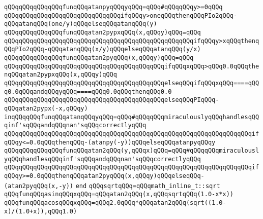 \newline
\verb|qQQqqQQqqQQqqQQqfunqQQqatanpyqQQqyqQQq=qQQq#qQQqqQQqy>=0qQQq|\newline
\verb|qQQqqQQqqQQqqQQqqQQqqQQqqQQqqQQqifqQQqy>oneqQQqthenqQQqPIo2qQQq-qQQqatanqQQq(one/y)qQQqelseqQQqatanqQQq(y)|\newline
\newline
\verb|qQQqqQQqqQQqqQQqfunqQQqatan2pypxqQQq(x,qQQqy)qQQq=qQQq|\newline
\verb|qQQqqQQqqQQqqQQqqQQqqQQqqQQqqQQqqQQqqQQqqQQqqQQqqQQqifqQQqy>xqQQqthenqQQqPIo2qQQq-qQQqatanqQQq(x/y)qQQqelseqQQqatanqQQq(y/x)|\newline
\newline
\verb|qQQqqQQqqQQqqQQqfunqQQqatan2pyqQQq(x,qQQqy)qQQq=qQQq|\newline
\verb|qQQqqQQqqQQqqQQqqQQqqQQqqQQqqQQqqQQqqQQqqQQqifqQQqxqQQq>qQQq0.0qQQqthenqQQqatan2pypxqQQq(x,qQQqy)qQQq|\newline
\verb|qQQqqQQqqQQqqQQqqQQqqQQqqQQqqQQqqQQqqQQqqQQqelseqQQqifqQQqxqQQq====qQQq0.0qQQqandqQQqyqQQq====qQQq0.0qQQqthenqQQq0.0|\newline
\verb|qQQqqQQqqQQqqQQqqQQqqQQqqQQqqQQqqQQqqQQqqQQqelseqQQqPIqQQq-qQQqatan2pypx(-x,qQQqy)|\newline
\newline
\verb|inqQQqqQQqfunqQQqatanqQQqyqQQq=qQQq#qQQqqQQqmiraculouslyqQQqhandlesqQQqinf'sqQQqandqQQqnan'sqQQqcorrectlyqQQq|\newline
\verb|qQQqqQQqqQQqqQQqqQQqqQQqqQQqqQQqqQQqqQQqqQQqqQQqqQQqqQQqqQQqqQQqqQQqifqQQqy<=0.0qQQqthenqQQq-(atanpy(-y))qQQqelseqQQqatanpyqQQqy|\newline
\newline
\verb|qQQqqQQqqQQqqQQqfunqQQqatan2qQQq(y,qQQqx)qQQq=qQQq#qQQqqQQqmiraculouslyqQQqhandlesqQQqinf'sqQQqandqQQqnan'sqQQqcorrectlyqQQq|\newline
\verb|qQQqqQQqqQQqqQQqqQQqqQQqqQQqqQQqqQQqqQQqqQQqqQQqqQQqqQQqqQQqqQQqqQQqifqQQqy>=0.0qQQqthenqQQqatan2pyqQQq(x,qQQqy)qQQqelseqQQq-(atan2pyqQQq(x,-y))|\newline
\verb|end|\newline
\newline
\newline
\verb|qQQqsqrtqQQq=qQQqmath_inline_t::sqrt|\newline
\newline
\verb|qQQqfunqQQqasinqQQqxqQQq=qQQqatan2qQQq(x,qQQqsqrtqQQq(1.0-x*x))|\newline
\verb|qQQqfunqQQqacosqQQqxqQQq=qQQq2.0qQQq*qQQqatan2qQQq(sqrt((1.0-x)/(1.0+x)),qQQq1.0)|\newline
